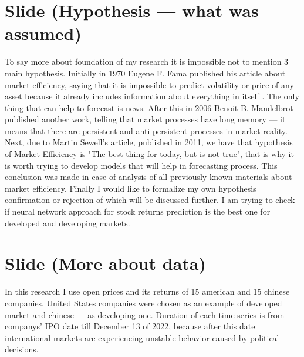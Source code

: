 \documentclass[a4paper, 12pt]{article}
\begin{document}
	\section{Slide (Hypothesis --- what was assumed)}
		To say more about foundation of my research it is impossible not to mention 3 main hypothesis. Initially in 1970 Eugene F. Fama published his article about market efficiency, saying that it is impossible to predict volatility or price of any asset because it already includes information about everything in itself . The only thing that can help to forecast is news. After this in 2006 Benoit B. Mandelbrot published another work, telling that market processes have long memory --- it means that there are persistent and anti-persistent processes in market reality. Next, due to Martin Sewell's article, published in 2011, we have that hypothesis of Market Efficiency is "The best thing for today, but is not true", that is why it is worth trying to develop models that will help in forecasting process. This conclusion was made in case of analysis of all previously known materials about market efficiency. Finally I would like to formalize my own hypothesis confirmation or rejection of which will be discussed further. I am trying to check if neural network approach for stock returns prediction is the best one for developed and developing markets.
	\section{Slide (More about data)}
		In this research I use open prices and its returns of 15 american and 15 chinese companies. United States companies were chosen as an example of developed market and chinese --- as developing one. Duration of each time series is from companys' IPO date till December 13 of 2022, because after this date international markets are experiencing unstable behavior caused by political decisions.
\end{document}
